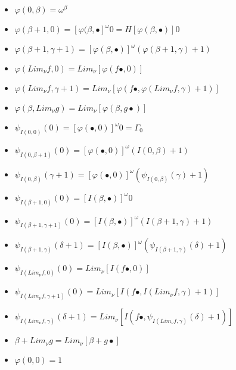 \documentclass[10pt]{article}
\begin{document}
\begin{itemize}
     \setlength{\itemsep}{1pt}
     \setlength{\parskip}{0pt}
     \setlength{\parsep}{0pt}

\item \( \varphi(0,\beta) = \omega^\beta \)
\item \( \varphi(\beta+1,0) = [\varphi(\beta,\bullet]^\omega 0 = H [\varphi(\beta,\bullet)] 0 \)
\item \( \varphi(\beta+1,\gamma+1) = [\varphi(\beta,\bullet)]^\omega (\varphi(\beta+1,\gamma)+1) \)
\item \( \varphi(Lim_\nu f,0) = Lim_\nu [\varphi(f \bullet,0)] \)
\item \( \varphi(Lim_\nu f,\gamma+1) = Lim_\nu [\varphi(f \bullet , \varphi(Lim_\nu f,\gamma)+1)] \)
\item \( \varphi(\beta,Lim_\nu g) = Lim_\nu [\varphi(\beta, g \bullet)] \)

\bigskip

\item \( \psi_{I(0,0)}(0) = [\varphi(\bullet,0)]^\omega 0 = \Gamma_0 \)
\item \( \psi_{I(0,\beta+1)}(0) = [\varphi(\bullet,0)]^\omega (I(0,\beta)+1) \)
\item \( \psi_{I(0,\beta)}(\gamma+1) = [\varphi(\bullet,0)]^\omega (\psi_{I(0,\beta)}(\gamma)+1) \)

\bigskip

\item \( \psi_{I(\beta+1,0)}(0) = [I(\beta,\bullet)]^\omega 0 \)
\item \( \psi_{I(\beta+1,\gamma+1)}(0) = [I(\beta,\bullet)]^\omega (I(\beta+1,\gamma)+1) \)
\item \( \psi_{I(\beta+1,\gamma)}(\delta+1) = [I(\beta,\bullet)]^\omega (\psi_{I(\beta+1,\gamma)}(\delta)+1) \)

\bigskip

\item \( \psi_{I(Lim_\nu f,0)}(0) = Lim_\nu [I(f \bullet,0)] \)
\item \( \psi_{I(Lim_\nu f,\gamma+1)}(0) = Lim_\nu [I(f \bullet,I(Lim_\nu f,\gamma)+1)] \)
\item \( \psi_{I(Lim_\nu f,\gamma)}(\delta+1) = Lim_\nu [I(f \bullet, \psi_{I(Lim_\nu f,\gamma)}(\delta)+1)] \)

\bigskip

\item \( \beta + Lim_\nu g  = Lim_\nu [\beta + g \bullet] \)
\item \( \varphi(0,0) = 1 \)


\end{itemize}
\end{document}
